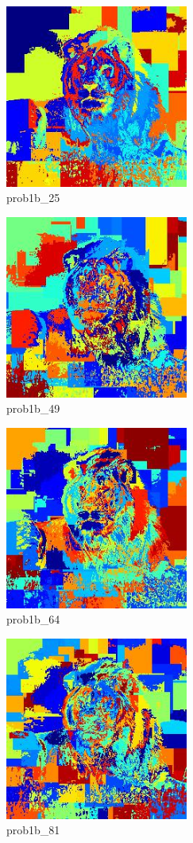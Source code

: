 \documentclass{article}
\begin{document}
\begin{figure}[!h]
  \centering
  \includegraphics[height=6cm]{code/outputs/prob1b_25.jpg}
  \caption{prob1b\_25}
\end{figure}
\begin{figure}[!h]
  \centering
  \includegraphics[height=6cm]{code/outputs/prob1b_49.jpg}
  \caption{prob1b\_49}
\end{figure}
\begin{figure}[!h]
  \centering
  \includegraphics[height=6cm]{code/outputs/prob1b_64.jpg}
  \caption{prob1b\_64}
\end{figure}
\begin{figure}[!h]
  \centering
  \includegraphics[height=6cm]{code/outputs/prob1b_81.jpg}
  \caption{prob1b\_81}
\end{figure}
\end{document}
